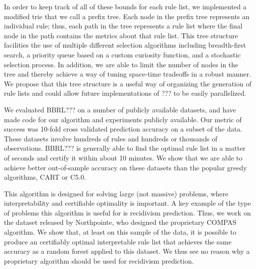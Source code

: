 \documentclass[aoas,preprint]{imsart}
\begin{document}
In order to keep track of all of these bounds for each rule list, we implemented a modified trie that we call a prefix tree. Each node in the prefix tree represents an individual rule; thus, each path in the tree represents a rule list where the final node in the path contains the metrics about that rule list. This tree structure facilities the use of multiple different selection algorithms including breadth-first search, a priority queue based on a custom curiosity function, and a stochastic selection process. In addition, we are able to limit the number of nodes in the tree and thereby achieve a way of tuning space-time tradeoffs in a robust manner. We propose that this tree structure is a useful way of organizing the generation of rule lists and could allow future implementations of ??? to be easily parallelized.

We evaluated BBRL??? on a number of publicly available datasets, and have made code for our algorithm and experiments publicly available. Our metric of success was 10-fold cross validated prediction accuracy on a subset of the data. These datasets involve hundreds of rules and hundreds or thousands of observations. BBRL??? is generally able to find the optimal rule list in a matter of seconds and certify it within about 10 minutes. We show that we are able to achieve better out-of-sample accuracy on these datasets than the popular greedy algorithms, CART or C5.0.

This algorithm is designed for solving large (not massive) problems, where interpretability and certifiable optimality is important. A key example of the type of problems this algorithm is useful for is recidivism prediction. Thus, we work on the dataset released by Northpointe, who designed the proprietary COMPAS algorithm. We show that, at least on this sample of the data, it is possible to produce an certifiably optimal interpretable rule list that achieves the same accuracy as a random forest applied to this dataset. We thus see no reason why a proprietary algorithm should be used for recidivism prediction.



\end{document}
